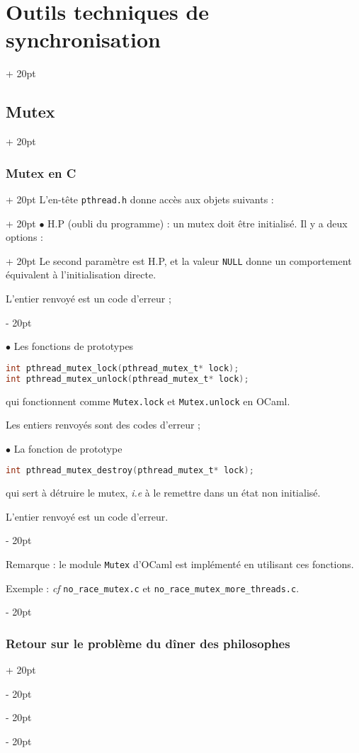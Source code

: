 \documentclass[a4paper, 12pt, twoside]{article}
\newcommand{\ind}[1][20pt]{\advance\leftskip + #1}
\newcommand{\deind}[1][20pt]{\advance\leftskip - #1}
\newenvironment{indt}[2][20pt]{#2 \par \ind[#1]}{\par \deind} %
\begin{document}
\begin{indt}{\section{Outils techniques de synchronisation}}
\begin{indt}{\subsection{Mutex}}
\begin{indt}{\subsubsection{Mutex en C}}
\begin{indt}{L'en-tête \texttt{pthread.h} donne accès aux objets suivants :}
\begin{indt}{$\bullet$ H.P (oubli du programme) : un mutex doit être initialisé. Il y a deux options :}
                        Le second paramètre est H.P, et la valeur \texttt{NULL} donne un comportement équivalent à l'initialisation directe.

                        L'entier renvoyé est un code d'erreur ;
                    \end{indt}

                    \vspace{6pt}
                    
                    $\bullet$ Les fonctions de prototypes
                    \begin{lstlisting}[language=C, xleftmargin=100pt]
int pthread_mutex_lock(pthread_mutex_t* lock);
int pthread_mutex_unlock(pthread_mutex_t* lock);\end{lstlisting}

                    qui fonctionnent comme \texttt{Mutex.lock} et \texttt{Mutex.unlock} en OCaml.

                    Les entiers renvoyés sont des codes d'erreur ;

                    \vspace{6pt}
                    
                    $\bullet$ La fonction de prototype
                    \begin{lstlisting}[language=C, xleftmargin=100pt]
int pthread_mutex_destroy(pthread_mutex_t* lock);\end{lstlisting}

                    qui sert à détruire le mutex, \textit{i.e} à le remettre dans un état non initialisé.

                    L'entier renvoyé est un code d'erreur.
                \end{indt}

                \vspace{12pt}
                
                Remarque : le module \texttt{Mutex} d'OCaml est implémenté en utilisant ces fonctions.

                Exemple : \textit{cf} \texttt{no\_race\_mutex.c} et \texttt{no\_race\_mutex\_more\_threads.c}.
            \end{indt}

            \vspace{12pt}
            
            \begin{indt}{\subsubsection{Retour sur le problème du dîner des philosophes}}
                \label{3.1.4}


\end{indt}
\end{indt}
\end{indt}
\end{document}
